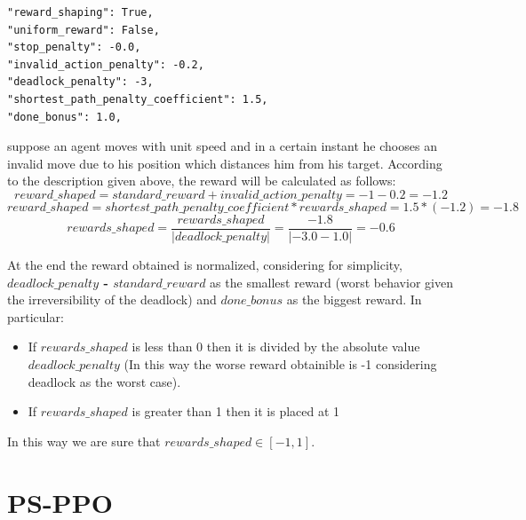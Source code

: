 \documentclass[11pt, a4paper, hidelinks]{report}
\begin{document}
\begin{lstlisting}[label={lst:rewards-params}]
"reward_shaping": True,
"uniform_reward": False,
"stop_penalty": -0.0,
"invalid_action_penalty": -0.2,
"deadlock_penalty": -3,
"shortest_path_penalty_coefficient": 1.5,
"done_bonus": 1.0,
\end{lstlisting}

suppose an agent moves with unit speed and in a certain instant he chooses an invalid move due to his position which distances him from his target.
According to the description given above, the reward will be calculated as follows:
\begin{equation*}
reward\_shaped = standard\_reward + invalid\_action\_penalty = -1 -0.2 = -1.2
\end{equation*}
\begin{equation*}
reward\_shaped = shortest\_path\_penalty\_coefficient * rewards\_shaped = 1.5 * (-1.2)= -1.8
\end{equation*}
\begin{equation*}
rewards\_shaped = \frac{rewards\_shaped}{|deadlock\_penalty|} = \frac{-1.8}{|-3.0 - 1.0|} = -0.6
\end{equation*}

At the end the reward obtained is normalized, considering for simplicity,  \textbf{$deadlock\_penalty$ - $standard\_reward$} as the smallest reward (worst behavior given the irreversibility of the deadlock) and \textbf{$done\_bonus$} as the biggest reward. In particular:

\begin{itemize}
	\item If $rewards\_shaped$ is less than 0 then it is divided by the absolute value $deadlock\_penalty$ (In this way the worse reward obtainible is -1 considering deadlock as the worst case).
	\item If $rewards\_shaped$ is greater than 1 then it is placed at 1 
\end{itemize}

In this way we are sure that $rewards\_shaped \in [-1, 1]$.

\section{PS-PPO}\label{sec:ps-ppo}
\end{document}
